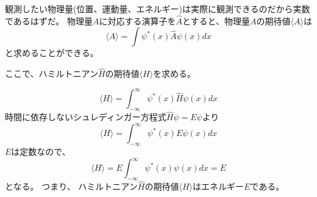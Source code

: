 \documentclass[dvipdfmx]{beamer}
\begin{document}
    \begin{frame}{\insertsubsection}
        観測したい物理量(位置、運動量、エネルギー)は実際に観測できるのだから実数であるはずだ。
        物理量$A$に対応する演算子を$\hat{A}$とすると、物理量$A$の期待値$\langle A \rangle$は
        \begin{equation}
            \langle A \rangle = \int \psi^*(x) \hat{A} \psi(x) dx
        \end{equation}
        と求めることができる。
    \end{frame}

    \begin{frame}{\insertsubsection}
        ここで、ハミルトニアン$\hat{H}$の期待値$\langle H \rangle$を求める。

        \begin{equation}
            \langle H \rangle = \int_{-\infty}^\infty \psi^*(x) \hat{H} \psi(x) dx
        \end{equation}
        時間に依存しないシュレディンガー方程式$\hat{H}\psi = E\psi$より
        \begin{equation}
            \langle H \rangle = \int_{-\infty}^\infty \psi^*(x) E \psi(x) dx
        \end{equation}
        $E$は定数なので、
        \begin{equation}
            \langle H \rangle = E\int_{-\infty}^\infty \psi^*(x)\psi(x) dx = E
        \end{equation}
        となる。
        つまり、
        \alert{ハミルトニアン$\hat{H}$の期待値$\langle H \rangle$はエネルギー$E$}である。
    \end{frame}

\end{document}
